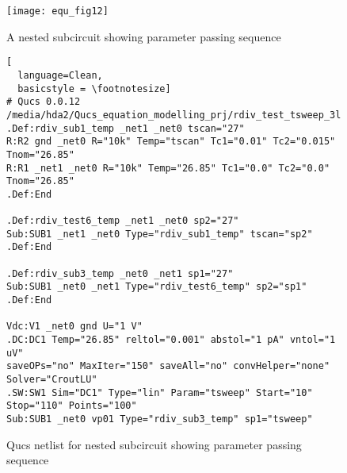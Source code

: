 \begin{figure}[h]
  \centering
  \texttt{[image: equ\_fig12]}  
  \caption{A nested subcircuit showing parameter passing sequence }
  \label{fig:equ_12}
\end{figure} 

\begin{figure} [h]
  \centering 
 \begin{lstlisting}[
  language=Clean,
  basicstyle = \footnotesize]
# Qucs 0.0.12  /media/hda2/Qucs_equation_modelling_prj/rdiv_test_tsweep_3l.sch
.Def:rdiv_sub1_temp _net1 _net0 tscan="27"
R:R2 gnd _net0 R="10k" Temp="tscan" Tc1="0.01" Tc2="0.015" Tnom="26.85"
R:R1 _net1 _net0 R="10k" Temp="26.85" Tc1="0.0" Tc2="0.0" Tnom="26.85"
.Def:End

.Def:rdiv_test6_temp _net1 _net0 sp2="27"
Sub:SUB1 _net1 _net0 Type="rdiv_sub1_temp" tscan="sp2"
.Def:End

.Def:rdiv_sub3_temp _net0 _net1 sp1="27"
Sub:SUB1 _net0 _net1 Type="rdiv_test6_temp" sp2="sp1"
.Def:End

Vdc:V1 _net0 gnd U="1 V" 
.DC:DC1 Temp="26.85" reltol="0.001" abstol="1 pA" vntol="1 uV" 
saveOPs="no" MaxIter="150" saveAll="no" convHelper="none" Solver="CroutLU"
.SW:SW1 Sim="DC1" Type="lin" Param="tsweep" Start="10" Stop="110" Points="100"
Sub:SUB1 _net0 vp01 Type="rdiv_sub3_temp" sp1="tsweep"

\end{lstlisting}
  \caption{Qucs netlist for nested subcircuit showing parameter passing sequence}
  \label{fig:equ_13}
\end{figure} 




